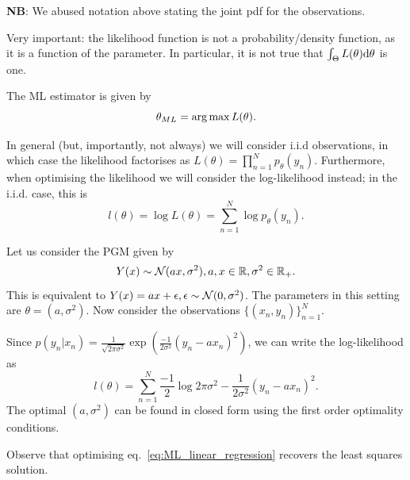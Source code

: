 \textbf{NB}: We abused notation above stating the joint pdf for the observations.

\begin{remark}
	Very important: the likelihood function is not a probability/density function, as it is a function of the parameter. In particular, it is not true that $\int_\Theta L(\theta){\text{d}} \theta$ is one.	
\end{remark}

\begin{definition}
	The ML estimator is given by 
	\begin{equation}
		\theta_{ML} = \operatorname*{arg\,max} L(\theta).
	\end{equation}
\end{definition}

\begin{remark}
	In general (but, importantly, not always) we will consider i.i.d observations, in which case the likelihood factorises as $L(\theta) = \prod_{n=1}^N p_\theta(y_n)$. Furthermore, when optimising the likelihood we will consider the log-likelihood instead; in the i.i.d. case, this is
	\begin{equation}
		l(\theta) = \log L(\theta) = \sum_{n=1}^N \log p_\theta(y_n).
	\end{equation}
\end{remark}

\begin{example}
	Let us consider the PGM given by 
	\begin{equation}
		Y(x) \sim {\mathcal N}(ax, \sigma^2), a,x\in{\mathbb R}, \sigma^2\in{\mathbb R}_+.
	\end{equation}
	This is equivalent to $Y(x)=ax + \epsilon, \epsilon\sim{\mathcal N}(0,\sigma^2)$. The parameters in this setting are  $\theta = (a,\sigma^2)$. Now consider the observations $\{(x_n,y_n)\}_{n=1}^N$. 

	Since $p(y_n|x_n) = \frac{1}{\sqrt{2\pi\sigma^2}}\exp\left(\frac{-1}{2\sigma^2}(y_n-ax_n)^2\right)$, we can write the log-likelihood as 
	\begin{equation}
		l(\theta) = \sum_{n=1}^{N} \frac{-1}{2}\log 2\pi\sigma^2 - \frac{1}{2\sigma^2}(y_n-ax_n)^2. \label{eq:ML_linear_regression}
	\end{equation}
	The optimal $(a,\sigma^2)$ can be found in closed form using the first order optimality conditions. 
\end{example}

\begin{remark}
	Observe that optimising eq.~\eqref{eq:ML_linear_regression} recovers the least squares solution.
\end{remark}

